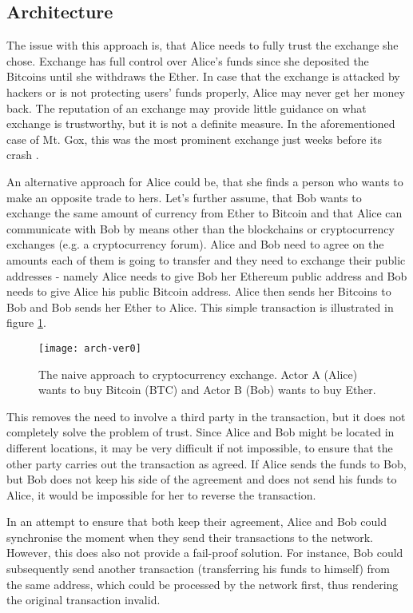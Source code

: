 \subsection{Architecture}
% 

The issue with this approach is, that Alice needs to fully trust the exchange she chose. Exchange has full control over Alice's funds since she deposited the Bitcoins until she withdraws the Ether. In case that the exchange is attacked by hackers or is not protecting users' funds properly, Alice may never get her money back. The reputation of an exchange may provide little guidance on what exchange is trustworthy, but it is not a definite measure. In the aforementioned case of Mt. Gox, this was the most prominent exchange just weeks before its crash \cite{Popper2014ApparentTimes}.

An alternative approach for Alice could be, that she finds a person who wants to make an opposite trade to hers. Let's further assume, that Bob wants to exchange the same amount of currency from Ether to Bitcoin and that Alice can communicate with Bob by means other than the blockchains or cryptocurrency exchanges (e.g. a cryptocurrency forum). Alice and Bob need to agree on the amounts each of them is going to transfer and they need to exchange their public addresses - namely Alice needs to give Bob her Ethereum public address and Bob needs to give Alice his public Bitcoin address. Alice then sends her Bitcoins to Bob and Bob sends her Ether to Alice. This simple transaction is illustrated in figure \ref{fig:arch-ver0}.

\begin{figure}[ht]
    \centering
    \texttt{[image: arch-ver0]}
    \caption{The naive approach to cryptocurrency exchange. Actor A (Alice) wants to buy Bitcoin (BTC) and Actor B (Bob) wants to buy Ether. }
    \label{fig:arch-ver0}
\end{figure}

This removes the need to involve a third party in the transaction, but it does not completely solve the problem of trust. Since Alice and Bob might be located in different locations, it may be very difficult if not impossible, to ensure that the other party carries out the transaction as agreed. If Alice sends the funds to Bob, but Bob does not keep his side of the agreement and does not send his funds to Alice, it would be impossible for her to reverse the transaction. 

In an attempt to ensure that both keep their agreement, Alice and Bob could synchronise the moment when they send their transactions to the network. However, this does also not provide a fail-proof solution. For instance, Bob could subsequently send another transaction (transferring his funds to himself) from the same address, which could be processed by the network first, thus rendering the original transaction invalid.

